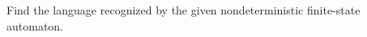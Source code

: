 \documentclass[../main.tex]{subfiles}
\begin{document}
Find the language recognized by the given nondeterministic finite-state automaton.

\solution
\end{document}
